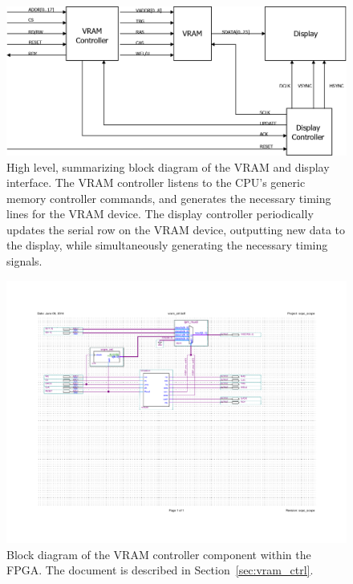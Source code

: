 \documentclass[titlepage]{scrartcl}
\begin{document}
	\begin{figure}[h!]
	\includegraphics[width=21cm, angle=90, origin=c]{img/vram_blocks.png}
                	\caption{High level, summarizing block diagram of the VRAM and display interface. The VRAM controller listens to the CPU's generic memory controller commands, and generates the necessary timing lines for the VRAM device. The display controller periodically updates the serial row on the VRAM device, outputting new data to the display, while simultaneously generating the necessary timing signals.}
               	\label{fig:vram_disp_blocks}
	\end{figure}

	\begin{figure}[h!]
	\vspace{-4cm}
	\centerline{\includegraphics[width=30cm, angle=90, origin=c]{img/vram_ctrl.pdf}}
		\vspace{-2cm}
                	\caption{Block diagram of the VRAM controller component within the FPGA. The document is described in Section~\ref{sec:vram_ctrl}.}
               	\label{fig:vram_bdf}
	\end{figure}
\end{document}
